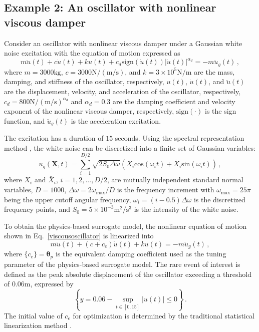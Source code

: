 \documentclass[number,preprint,3p]{elsarticle}
\newcommand{\1}[2]{\mathbb{I}_{#1}\left(#2\right)}
\newcommand{\vect}[1]{\boldsymbol{#1}}
\begin{document}
	\subsection{Example 2: An oscillator with nonlinear viscous damper}\label{Sec:Applicationtwo}
	\noindent Consider an oscillator with nonlinear viscous damper under a Gaussian white noise excitation with the equation of motion expressed as
	\begin{equation}\label{viscousoscillator}
		m\ddot{u}(t)+c\dot{u}(t)+ku(t)+c_{d}\mathrm{sign}(\dot{u}(t))\left | \dot{u}(t) \right |^{\alpha_{d}}=-m\ddot{u}_g(t)\,,
	\end{equation}
	where $m=3000\mathrm{kg}$, $c=3000\mathrm{N/(m/s)}$, and $k=3\times10^5\mathrm{N/m}$ are the mass, damping, and stiffness of the oscillator, respectively, $u(t)$, $\dot{u}(t)$, and $\ddot{u}(t)$ are the displacement, velocity, and acceleration of the oscillator, respectively, $c_{d}=800\mathrm{N/(m/s)}^{\alpha_{d}}$ and $\alpha_{d}=0.3$ are the damping coefficient and velocity exponent of the nonlinear viscous damper, respectively, $\mathrm{sign}(\cdot )$ is the sign function, and $\ddot{u}_g(t)$ is the acceleration excitation.
	
	The excitation has a duration of $15$ seconds. Using the spectral representation method \cite{shinozuka1991simulation}, the white noise can be discretized into a finite set of Gaussian variables:  
	\begin{equation}\label{Seismicexcitationrandomprocess}
		\ddot{u}_g(\vect{X},t)=\sum_{i=1}^{D/2}\sqrt{2S_{0}\Delta \omega }\left ( X_i\textrm{cos}(\omega_it)+ \bar{X}_i\mathrm{sin}(\omega_it)\right )\,,
	\end{equation}
	where $X_i$ and $\bar{X}_i$, $i=1,2,...,D/2$, are mutually independent standard normal variables, $D=1000$, $\Delta \omega=2\omega_{\max}/D$ is the frequency increment with $\omega_{\max}=25\pi$ being the upper cutoff
	angular frequency, $\omega_i=(i-0.5)\Delta\omega$ is the discretized frequency points, and $S_0=5\times10^{-3} \mathrm{m^2/s^3}$ is the intensity of the white noise.
	
	To obtain the physics-based surrogate model, the nonlinear equation of motion shown in Eq.~\eqref{viscousoscillator} is linearized into
	\begin{equation}\label{viscousoscillatorlinearized}
		m\ddot{u}(t)+(c+c_{e})\dot{u}(t)+ku(t)=-m\ddot{u}_g(t)\,,
	\end{equation}
	where $\{c_{e}\}=\vect\theta_p$ is the equivalent damping coefficient used as the tuning parameter of the physics-based surrogate model. The rare event of interest is defined as the peak absolute displacement of the oscillator exceeding a threshold of $0.06$m, expressed by
 \begin{equation}
  \left\lbrace y=0.06-\sup_{t\in[0,15]}|u(t)|\leq0\right\rbrace\,. 
 \end{equation}
 The initial value of $c_{e}$ for optimization is determined by the traditional statistical linearization method \cite{xian2020stochastic}. 
 
\end{document}
